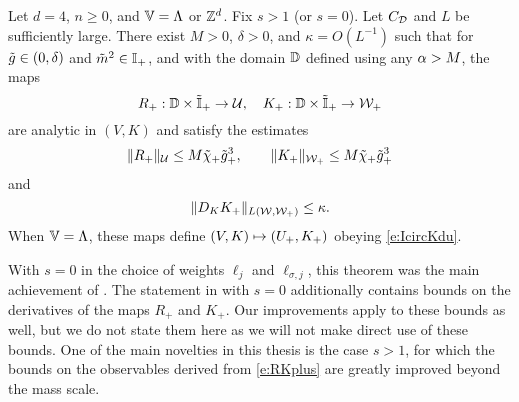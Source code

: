
\begin{theorem}
\label{thm:step-mr-fv}
Let $d = 4$, $n \ge 0$, and $\mathbb{V} = \Lambda$ or ${ {{\mathbb Z}}^d }$.
Fix $s > 1$ (or $s = 0$).
Let $C_{\mathcal{D}}$ and $L$ be sufficiently large.
There exist $M>0$, $\delta >0$, and $\kappa = O(L^{-1})$			%
such that for $\tilde{g} \in (0,\delta)$ and $\tilde{m}^2 \in \mathbb{I}_+$,		%
and with the domain $\mathbb{D}$ defined using any $\alpha> M$,
the maps
\begin{equation}
\label{e:RKplusmaps}
R_+:\domRG \times \Igen_+ %
	\to \Ucal,
		\quad
K_+:\domRG \times \Igen_+ %
	\to \Wcal_{+}%
\end{equation}
are analytic in $(V, K)$											%
and satisfy the estimates
\begin{equation}
\label{e:RKplus}
\|R_+\|_{\mathcal{U}}
	\le
M\tilde{\chi}_+\tilde{g}_+^{3},
	\qquad
\|K_+\|_{\mathcal{W}_+}
	\le
M\tilde{\chi}_+ \tilde{g}_+^{3}
\end{equation}
and
\begin{equation}
\label{e:DKkappa}
\|D_K K_+\|_{L(\mathcal{W},\mathcal{W}_+)} \le \kappa.
\end{equation}
When $\mathbb{V} = \Lambda$, these maps define $(V,K)\mapsto (U_+,K_+)$
obeying \eqref{e:IcircKdu}.
\end{theorem}


With $s = 0$ in the choice of weights $\ell_j$ and $\ell_{\sigma,j}$,
this theorem was the main achievement of \cite{BS-rg-step}.
The statement in \cite{BS-rg-step} with $s = 0$ additionally contains
bounds on the derivatives of the maps $R_+$ and $K_+$. Our improvements
apply to these bounds as well, but we do not state them here as we will
not make direct use of these bounds.
One of the main novelties in this thesis is the case $s > 1$,
for which the bounds on the observables derived from \eqref{e:RKplus}
are greatly improved beyond the mass scale.

